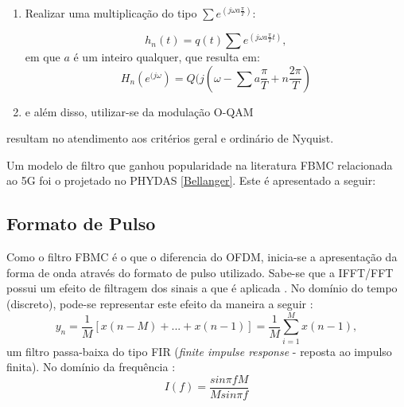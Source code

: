 \begin{enumerate}

\item Realizar uma multiplicação do tipo $\sum e^{(j \omega a\frac{\pi}{T})}$:

\begin{equation}
h_{n}(t) = q(t)\sum e^{(j \omega a\frac{\pi}{T}t)},
\end{equation}
em que $a$ é um inteiro qualquer, que resulta em:
\begin{equation}
H_{n}(e^{(j \omega}) = Q(j(\omega - \sum a\frac{\pi}{T} + n\frac{2\pi}{T})
\end{equation}

\item e além disso, utilizar-se da modulação O-QAM

\end{enumerate}
resultam no atendimento aos critérios geral e ordinário de Nyquist. 
\par Um modelo de filtro que ganhou popularidade na literatura FBMC relacionada ao 5G foi o projetado no PHYDAS \ref{Bellanger}. Este é apresentado a seguir:

\subsection{Formato de Pulso}

Como o filtro FBMC é o que o diferencia do OFDM, inicia-se a apresentação da forma de onda através do formato de pulso utilizado. Sabe-se que a IFFT/FFT possui um efeito de filtragem dos sinais a que é aplicada \cite{Boroujeny}. No domínio do tempo (discreto), pode-se representar este efeito da maneira a seguir \cite{Bellanger}:
\begin{equation}
y_{n} = \frac{1}{M}[x(n-M)+...+x(n-1)] = \frac{1}{M}\sum_{i=1}^{M}x(n-1),
\end{equation}
um filtro passa-baixa do tipo FIR (\textit{finite impulse response} - reposta ao impulso finita). No domínio da frequência \cite{Bellanger}:
\begin{equation}\label{eq_freq}
I(f) = \frac{sin\pi fM}{Msin\pi f}
\end{equation}

